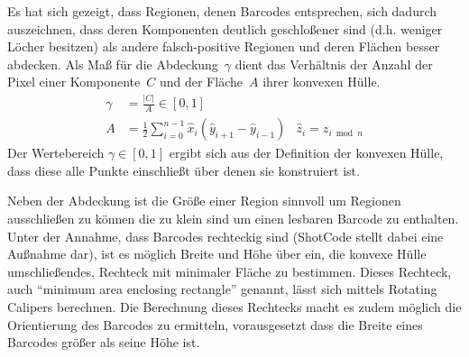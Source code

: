 \begin{enumerate}[(1)]
Es hat sich gezeigt, dass Regionen, denen Barcodes entsprechen, sich dadurch auszeichnen, dass deren Komponenten deutlich geschloßener sind (d.h. weniger Löcher besitzen) als andere falsch-positive Regionen und deren Flächen besser abdecken.
Als Maß für die Abdeckung~$\gamma$ dient das Verhältnis der Anzahl der Pixel einer Komponente~$C$ und der Fläche~$A$ \cite{braden1986} ihrer konvexen Hülle.
\begin{align}
  \gamma &= \frac{|C|}{A} \in [0,1] \\
       A &= \frac{1}{2} \sum_{i=0}^{n-1}{\hat x_i (\hat y_{i+1} - \hat y_{i-1})}
         & \hat z_i = z_{i \bmod n}
\end{align}
Der Wertebereich $\gamma\in[0,1]$ ergibt sich aus der Definition der konvexen Hülle, dass diese alle Punkte einschließt über denen sie konstruiert ist.

Neben der Abdeckung ist die Größe einer Region sinnvoll um Regionen ausschließen zu können die zu klein sind um einen lesbaren Barcode zu enthalten.
Unter der Annahme, dass Barcodes rechteckig sind (ShotCode stellt dabei eine Außnahme dar), ist es möglich Breite und Höhe über ein, die konvexe Hülle umschließendes, Rechteck mit minimaler Fläche zu bestimmen.
Dieses Rechteck, auch "`minimum area enclosing rectangle"' genannt, lässt sich mittels Rotating Calipers berechnen.
Die Berechnung dieses Rechtecks macht es zudem möglich die Orientierung des Barcodes zu ermitteln, vorausgesetzt dass die Breite eines Barcodes größer als seine Höhe ist.
\end{enumerate}

\renewcommand{\thesubfigure}{\scriptsize\alph{subfigure}}

